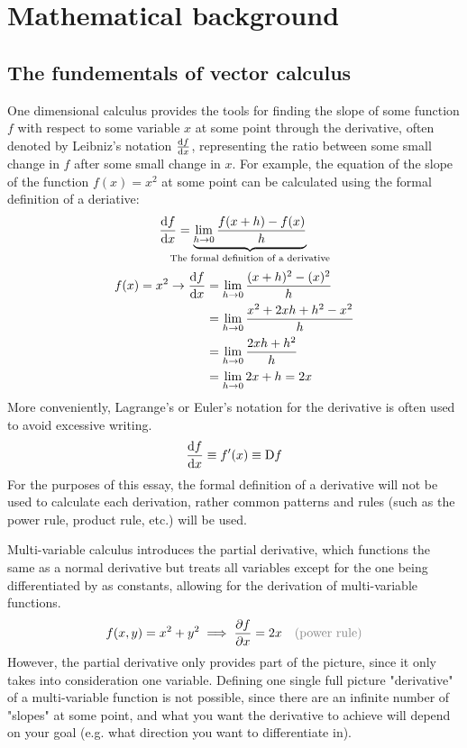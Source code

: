 \section{Mathematical background}
\subsection{The fundementals of vector calculus}
One dimensional calculus provides the tools for finding the slope of some function $f$ with respect to some variable $x$ at some point through the derivative, often denoted by Leibniz's notation $\frac{\mathrm{d} f}{\mathrm{d} x}$, representing the ratio between some small change in $f$ after some small change in $x$. For example, the equation of the slope of the function $f(x)=x^2$ at some point can be calculated using the formal definition of a deriative:
\begin{equation}
	\der{f}{x}=\underbrace{\lim_{h\rightarrow0}\frac{f(x+h)-f(x)}{h}}_\text{\hidewidth The formal definition of a derivative\hidewidth}\\
\end{equation}
\begin{align*}
	f(x)=x^2\rightarrow\frac{\mathrm{d} f}{\mathrm{d} x}&=\lim_{h\rightarrow0}\frac{(x+h)^2-(x)^2}{h}\\
	&=\lim_{h\rightarrow0}\frac{x^2+2xh+h^2-x^2}{h}\\
	&=\lim_{h\rightarrow0}\frac{2xh+h^2}{h}\\
	&=\lim_{h\rightarrow0}2x+h=2x
\end{align*}
More conveniently, Lagrange's or Euler's notation for the derivative is often used to avoid excessive writing.
$$\frac{\mathrm{d} f}{\mathrm{d} x}\equiv f'(x)\equiv \mathrm{D}f$$
For the purposes of this essay, the formal definition of a derivative will not be used to calculate each derivation, rather common patterns and rules (such as the power rule, product rule, etc.) will be used. 

Multi-variable calculus introduces the partial derivative, which functions the same as a normal derivative but treats all variables except for the one being differentiated by as constants, allowing for the derivation of multi-variable functions.
\begin{align*}
	f(x,y)=x^2+y^2\implies\partialder{f}{x}=2x && \justify{power rule}
\end{align*}
However, the partial derivative only provides part of the picture, since it only takes into consideration one variable. Defining one single full picture "derivative" of a multi-variable function is not possible, since there are an infinite number of "slopes" at some point, and what you want the derivative to achieve will depend on your goal (e.g. what direction you want to differentiate in).

